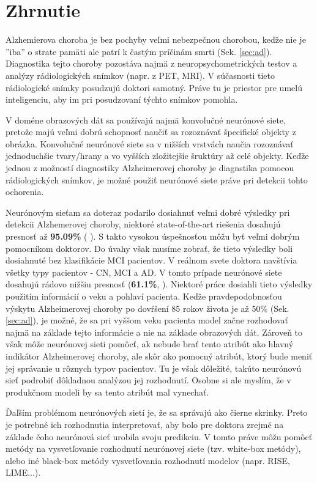 \section{Zhrnutie}

Alzhemierova choroba je bez pochyby veľmi nebezpečnou chorobou, keďže nie je ''iba'' o strate pamäti ale patrí k častým príčinám smrti (Sek. \ref{sec:ad}). Diagnostika tejto choroby pozostáva najmä z neuropsychometrických testov a analýzy rádiologických snímkov (napr. z PET, MRI). V súčasnosti tieto rádiologické snímky posudzujú doktori samotný. Práve tu je priestor pre umelú inteligenciu, aby im pri posudzovaní týchto snímkov pomohla.

V doméne obrazových dát sa používajú najmä konvolučné neurónové siete, pretože majú veľmi dobrú schopnosť naučiť sa rozoznávať špecifické objekty z obrázka. Konvolučné neurónové siete sa v nižších vrstvách naučia rozoznávať jednoduchšie tvary/hrany a vo vyšších zložitejšie šruktúry až celé objekty. Keďže jednou z možností diagnostiky Alzheimerovej choroby je diagnstika pomocou rádiologických snímkov, je možné použiť neurónové siete práve pri detekcii tohto ochorenia.

Neurónovým sieťam sa doteraz podarilo dosiahnuť veľmi dobré výsledky pri detekcii Alzhemerovej choroby, niektoré state-of-the-art riešenia dosahujú presnosť až \textbf{95.09\%} (\citeauthor*{suk2016deep} \citeyear{suk2016deep}). S takto vysokou úspešnosťou môžu byť veľmi dobrým pomocníkom doktorov. Do úvahy však musíme zobrať, že tieto výsledky boli dosiahnuté bez klasifikácie MCI pacientov. V reálnom svete doktora navštívia všetky typy pacientov - CN, MCI a AD. V tomto prípade neurónové siete dosahujú rádovo nižšiu presnosť (\textbf{61.1\%}, \citeauthor*{bohle2019layer} \citeyear{bohle2019layer}). Niektoré práce dosiahli tieto výsledky použitím informácií o veku a pohlaví pacienta. Keďže pravdepodobnosťou výskytu Alzheimerovej choroby po dovŕšení 85 rokov života je až 50\% (Sek. \ref{sec:ad}), je možné, že sa pri vyššom veku pacienta model začne rozhodovať najmä na základe tejto informácie a nie na základe obrazových dát. Zároveň to však môže neurónovej sieti pomôcť, ak nebude brať tento atribút ako hlavný indikátor Alzheimerovej choroby, ale skôr ako pomocný atribút, ktorý bude meniť jej správanie u rôznych typov pacientov. Tu je však dôležité, takúto neurónovú sieť podrobiť dôkladnou analýzou jej rozhodnutí. Osobne si ale myslím, že v produkčnom modeli by sa tento atribút mal vynechať. 

Ďaľším problémom neurónových sietí je, že sa správajú ako čierne skrinky. Preto je potrebné ich rozhodnutia interpretovať, aby bolo pre doktora zrejmé na základe čoho neurónová sieť urobila svoju predikciu. V tomto práve môžu pomôcť metódy na vysvetľovanie rozhodnutí neurónovej siete (tzv. white-box metódy), alebo iné black-box metódy vysvetľovania rozhodnutí modelov (napr. RISE, LIME...).

